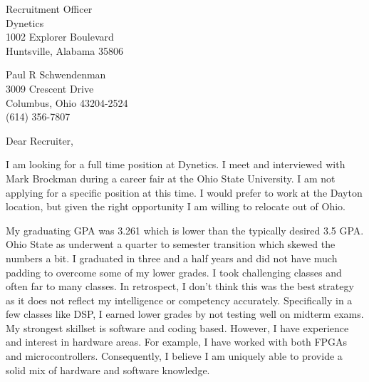 \documentclass[11pt]{letter} %
\begin{document}

\begin{letter}{Recruitment Officer \\
Dynetics \\
1002 Explorer Boulevard\\
Huntsville, Alabama 35806} 



\begin{center}
Paul R Schwendenman \\ %
3009 Crescent Drive \\ Columbus, Ohio 43204-2524 \\ (614) 356-7807 %
\end{center} 
\vfill

\signature{Paul Schwendenman} %


\opening{Dear Recruiter,} 

I am looking for a full time position at Dynetics. I meet and interviewed
with Mark Brockman during a career fair at the Ohio State University.  I am
not applying for a specific position at this time.  I would prefer to work
at the Dayton location, but given the right opportunity I am willing to
relocate out of Ohio.
 
My graduating GPA was 3.261 which is lower than the typically desired 3.5
GPA.  Ohio State as underwent a quarter to semester transition which skewed
the numbers a bit.  I graduated in three and a half years and did not have
much padding to overcome some of my lower grades.  I took challenging
classes and often far to many classes.  In retrospect, I don't think this
was the best strategy as it does not reflect my intelligence or competency
accurately.  Specifically in a few classes like DSP, I earned lower grades
by not testing well on midterm exams.  My strongest skillset is software and
coding based.  However, I have experience and interest in hardware areas. 
For example, I have worked with both FPGAs and microcontrollers. 
Consequently, I believe I am uniquely able to provide a solid mix of
hardware and software knowledge.


\end{letter}
\end{document}
